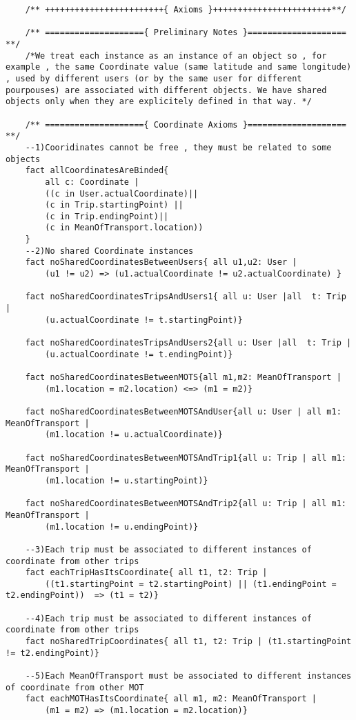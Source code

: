 \documentclass[a4paper,leqno]{book}
\begin{document}
\begin{lstlisting}
	/** ++++++++++++++++++++++++{ Axioms }++++++++++++++++++++++++**/
	
	/** ===================={ Preliminary Notes }==================== **/
	/*We treat each instance as an instance of an object so , for example , the same Coordinate value (same latitude and same longitude) , used by different users (or by the same user for different pourpouses) are associated with different objects. We have shared objects only when they are explicitely defined in that way. */
	
	/** ===================={ Coordinate Axioms }==================== **/
	--1)Cooridinates cannot be free , they must be related to some objects
	fact allCoordinatesAreBinded{
		all c: Coordinate |
		((c in User.actualCoordinate)||
		(c in Trip.startingPoint) ||
		(c in Trip.endingPoint)||
		(c in MeanOfTransport.location))
	}
	--2)No shared Coordinate instances
	fact noSharedCoordinatesBetweenUsers{ all u1,u2: User |
		(u1 != u2) => (u1.actualCoordinate != u2.actualCoordinate) }
	
	fact noSharedCoordinatesTripsAndUsers1{ all u: User |all  t: Trip |
		(u.actualCoordinate != t.startingPoint)}
	
	fact noSharedCoordinatesTripsAndUsers2{all u: User |all  t: Trip |
		(u.actualCoordinate != t.endingPoint)}
	
	fact noSharedCoordinatesBetweenMOTS{all m1,m2: MeanOfTransport |
		(m1.location = m2.location) <=> (m1 = m2)}
	
	fact noSharedCoordinatesBetweenMOTSAndUser{all u: User | all m1: MeanOfTransport |
		(m1.location != u.actualCoordinate)}
	
	fact noSharedCoordinatesBetweenMOTSAndTrip1{all u: Trip | all m1: MeanOfTransport |
		(m1.location != u.startingPoint)}
	
	fact noSharedCoordinatesBetweenMOTSAndTrip2{all u: Trip | all m1: MeanOfTransport |
		(m1.location != u.endingPoint)}
	
	--3)Each trip must be associated to different instances of coordinate from other trips
	fact eachTripHasItsCoordinate{ all t1, t2: Trip |
		((t1.startingPoint = t2.startingPoint) || (t1.endingPoint = t2.endingPoint))  => (t1 = t2)}
	
	--4)Each trip must be associated to different instances of coordinate from other trips
	fact noSharedTripCoordinates{ all t1, t2: Trip | (t1.startingPoint != t2.endingPoint)}
	
	--5)Each MeanOfTransport must be associated to different instances of coordinate from other MOT
	fact eachMOTHasItsCoordinate{ all m1, m2: MeanOfTransport |
		(m1 = m2) => (m1.location = m2.location)}
	

\end{lstlisting}
\end{document}
